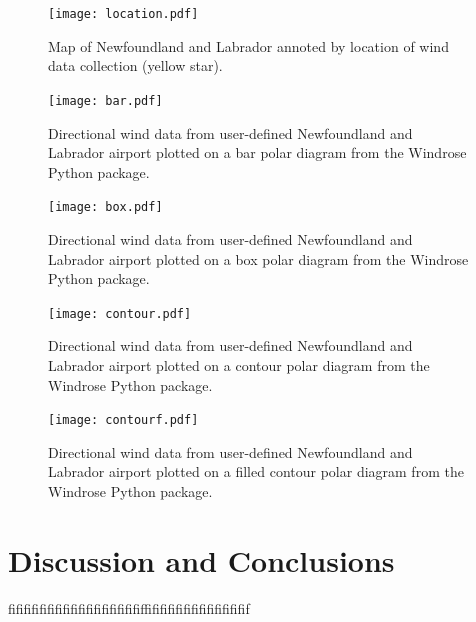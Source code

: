 \documentclass{article}
\begin{document}
\begin{figure}[h!]                                                                                                                                                                                                 
\centering                                                                                                                                                                                                         
\texttt{[image: location.pdf]}                                                                                                                                                                                                
\caption{Map of Newfoundland and Labrador annoted by location of wind data collection (yellow star).}
\label{location}                                                                                                              
\end{figure} 
  
\begin{figure}[h!]
\centering
\texttt{[image: bar.pdf]}
\caption{Directional wind data from user-defined Newfoundland and Labrador airport plotted on a bar polar diagram from the Windrose Python package.}
\label{bar}
\end{figure}

\begin{figure}[h!]
\centering
\texttt{[image: box.pdf]}
\caption{Directional wind data from user-defined Newfoundland and Labrador airport plotted on a box polar diagram from the Windrose Python package.}
\label{box}
\end{figure}

\begin{figure}[h!]
\centering
\texttt{[image: contour.pdf]}
\caption{Directional wind data from user-defined Newfoundland and Labrador airport plotted on a contour polar diagram from the Windrose Python package.}
\label{contour}
\end{figure}

\begin{figure}[h!]
\centering
\texttt{[image: contourf.pdf]}
\caption{Directional wind data from user-defined Newfoundland and Labrador airport plotted on a filled contour polar diagram from the Windrose Python package.}
\label{contourf}
\end{figure}

\section{Discussion and Conclusions}\label{Discussion_and_conclusions}
fifififififififififififififififififfififififififififififififif

\clearpage 


\end{document}
